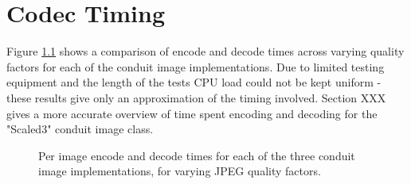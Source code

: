 \chapter{Codec Timing}

Figure \ref{graph:codec-speeds} shows a comparison of encode and decode times across varying quality factors for each of the conduit image implementations. Due to limited testing equipment and the length of the tests CPU load could not be kept uniform - these results give only an approximation of the timing involved. Section XXX gives a more accurate overview of time spent encoding and decoding for the "Scaled3" conduit image class.

\begin{figure}[tbph]
  \begin{center}
    

    \caption{Per image encode and decode times for each of the three conduit image implementations, for varying JPEG quality factors.}
    \label{graph:codec-speeds}
  \end{center}
\end{figure}